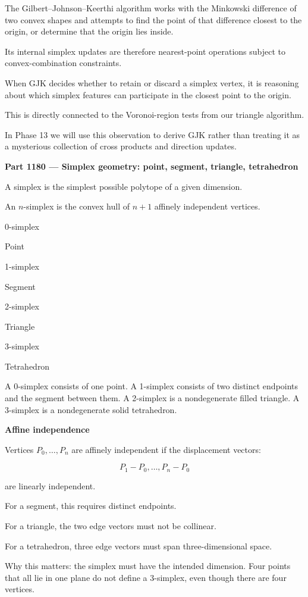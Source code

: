 The Gilbert--Johnson--Keerthi algorithm works with the Minkowski difference of two convex shapes and attempts to find the point of that difference closest to the origin, or determine that the origin lies inside.

Its internal simplex updates are therefore nearest-point operations subject to convex-combination constraints.

When GJK decides whether to retain or discard a simplex vertex, it is reasoning about which simplex features can participate in the closest point to the origin.

This is directly connected to the Voronoi-region tests from our triangle algorithm.

In Phase 13 we will use this observation to derive GJK rather than treating it as a mysterious collection of cross products and direction updates.

\textbf{Part 1180 --- Simplex geometry: point, segment, triangle, tetrahedron}

A simplex is the simplest possible polytope of a given dimension.

An \(n\)-simplex is the convex hull of \(n+1\) affinely independent vertices.

0-simplex

Point

1-simplex

Segment

2-simplex

Triangle

3-simplex

Tetrahedron

A 0-simplex consists of one point. A 1-simplex consists of two distinct endpoints and the segment between them. A 2-simplex is a nondegenerate filled triangle. A 3-simplex is a nondegenerate solid tetrahedron.

\textbf{Affine independence}

Vertices \(P_0,\ldots,P_n\) are affinely independent if the displacement vectors:

\[
P_1-P_0,\ldots,P_n-P_0
\]

are linearly independent.

For a segment, this requires distinct endpoints.

For a triangle, the two edge vectors must not be collinear.

For a tetrahedron, three edge vectors must span three-dimensional space.

Why this matters: the simplex must have the intended dimension. Four points that all lie in one plane do not define a 3-simplex, even though there are four vertices.

